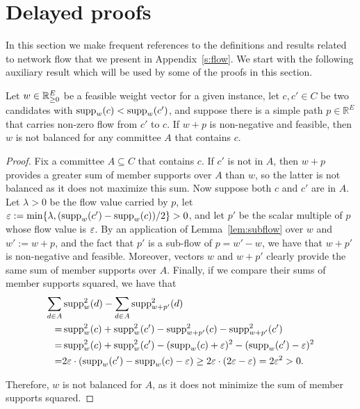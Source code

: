 
\section{Delayed proofs}\label{s:proofs}

In this section we make frequent references to the definitions and results related to network flow that we present in Appendix~\ref{s:flow}. We start with the following auxiliary result which will be used by some of the proofs in this section.

\begin{lemma}\label{lem:path}
Let $w\in \mathbb{R}_{\geq 0}^E$ be a feasible weight vector for a given instance, let $c,c'\in C$ be two candidates with $\operatorname{supp}_w(c)<\operatorname{supp}_w(c')$, and suppose there is a simple path $p\in\mathbb{R}^E$ that carries non-zero flow from $c'$ to $c$. If $w+p$ is non-negative and feasible, then $w$ is not balanced for any committee $A$ that contains $c$.
\end{lemma}

\begin{proof}
Fix a committee $A\subseteq C$ that contains $c$. If $c'$ is not in $A$, then $w+p$ provides a greater sum of member supports over $A$ than $w$, so the latter is not balanced as it does not maximize this sum. Now suppose both $c$ and $c'$ are in $A$. Let $\lambda>0$ be the flow value carried by $p$, let $\varepsilon:=\min\{\lambda, (\operatorname{supp}_w(c') - \operatorname{supp}_w(c))/2\}>0$, and let $p'$ be the scalar multiple of $p$ whose flow value is $\varepsilon$. By an application of Lemma~\ref{lem:subflow} over $w$ and $w':=w+p$, and the fact that $p'$ is a sub-flow of $p=w'-w$, we have that $w+p'$ is non-negative and feasible. 
Moreover, vectors $w$ and $w+p'$ clearly provide the same sum of member supports over $A$. Finally, if we compare their sums of member supports squared, we have that
\begin{align*}
\sum_{d\in A} & \operatorname{supp}_w^2(d)-\sum_{d\in A} \operatorname{supp}^2_{w+p'}(d) \\
=& \operatorname{supp}_w^2(c) +\operatorname{supp}_w^2(c')-\operatorname{supp}^2_{w+p'}(c) -\operatorname{supp}^2_{w+p'}(c')\\
=& \operatorname{supp}_w^2(c) +\operatorname{supp}_w^2(c') - (\operatorname{supp}_w(c) + \varepsilon)^2 - (\operatorname{supp}_w(c') - \varepsilon)^2 \\
=& 2\varepsilon\cdot (\operatorname{supp}_w(c') - \operatorname{supp}_w(c) - \varepsilon) \geq 2\varepsilon\cdot(2\varepsilon - \varepsilon)=2\varepsilon^2>0.
\end{align*}

Therefore, $w$ is not balanced for $A$, as it does not minimize the sum of member supports squared.  
\end{proof}

